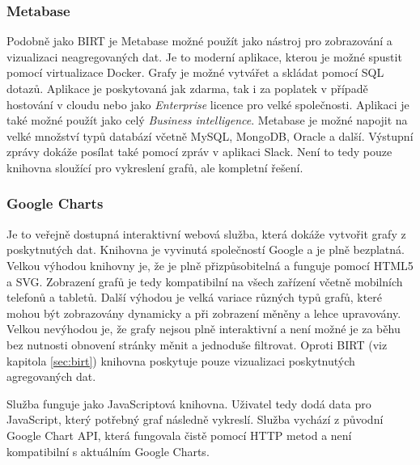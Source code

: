 \documentclass[czech,master,public,dept460,male,cpdeclaration,oneside]{diploma}
\begin{document}
\subsubsection{Metabase}
Podobně jako BIRT je Metabase možné použít jako nástroj pro zobrazování a vizualizaci neagregovaných dat. Je to moderní aplikace, kterou je možné spustit pomocí virtualizace Docker. Grafy je možné vytvářet a skládat pomocí SQL dotazů. Aplikace je poskytovaná jak zdarma, tak i za poplatek v případě hostování v cloudu nebo jako \textit{Enterprise} licence pro velké společnosti. Aplikaci je také možné použít jako celý \textit{Business intelligence}. Metabase je možné napojit na velké množství typů databází včetně MySQL, MongoDB, Oracle a další. Výstupní zprávy dokáže posílat také pomocí zpráv v aplikaci Slack. Není to tedy pouze knihovna sloužící pro vykreslení grafů, ale kompletní řešení. \cite{ref:metabase}


\subsubsection{Google Charts}
\label{sec:google_charts}
Je to veřejně dostupná interaktivní webová služba, která dokáže vytvořit grafy z poskytnutých dat. Knihovna je vyvinutá společností Google a je plně bezplatná.  Velkou výhodou knihovny je, že je plně přizpůsobitelná a funguje pomocí HTML5 a SVG. Zobrazení grafů je tedy kompatibilní na všech zařízení včetně mobilních telefonů a tabletů. Další výhodou je velká variace různých typů grafů, které mohou být zobrazovány dynamicky a při zobrazení měněny a lehce upravovány. Velkou nevýhodou je, že grafy nejsou plně interaktivní a není možné je za běhu bez nutnosti obnovení stránky měnit a jednoduše filtrovat. Oproti BIRT (viz kapitola \ref{sec:birt}) knihovna poskytuje pouze vizualizaci poskytnutých agregovaných dat.

Služba funguje jako JavaScriptová knihovna. Uživatel tedy dodá data pro JavaScript, který potřebný graf následně vykreslí. Služba vychází z původní Google Chart API, která fungovala čistě pomocí HTTP metod a není kompatibilní s aktuálním Google Charts. \cite{ref:google_charts}
\end{document}
